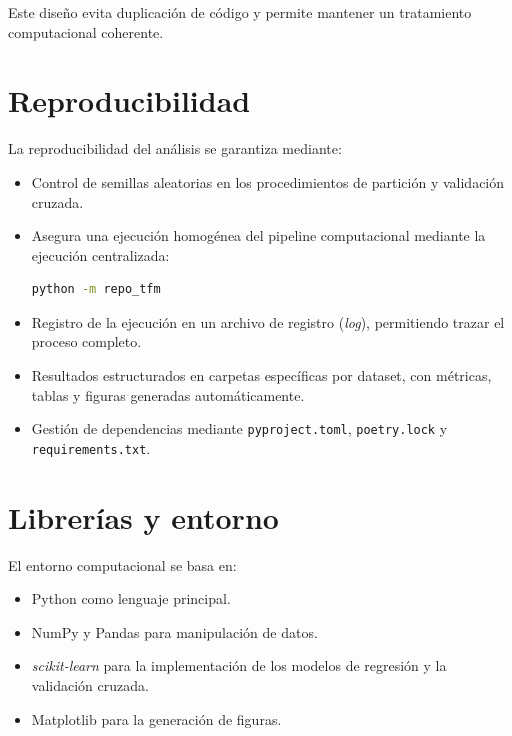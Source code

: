 \documentclass[12pt,a4paper]{report}
\begin{document}
Este diseño evita duplicación de código y permite mantener un tratamiento computacional coherente.

\section{Reproducibilidad}

La reproducibilidad del análisis se garantiza mediante:

\begin{itemize}

\item Control de semillas aleatorias en los procedimientos de partición y validación cruzada.

\item Asegura una ejecución homogénea del pipeline computacional mediante la ejecución centralizada:

\begin{lstlisting}[language=bash]
python -m repo_tfm
\end{lstlisting}


\item Registro de la ejecución en un archivo de registro (\textit{log}), permitiendo trazar el proceso completo.

\item Resultados estructurados en carpetas específicas por dataset, con métricas, tablas y figuras generadas automáticamente.

\item Gestión de dependencias mediante \texttt{pyproject.toml}, \texttt{poetry.lock} y \texttt{requirements.txt}.

\end{itemize}

\section{Librerías y entorno}

El entorno computacional se basa en:

\begin{itemize}

\item Python como lenguaje principal.

\item NumPy y Pandas para manipulación de datos.

\item \textit{scikit-learn} para la implementación de los modelos de regresión y la validación cruzada.

\item Matplotlib para la generación de figuras.

\end{itemize}
\end{document}
